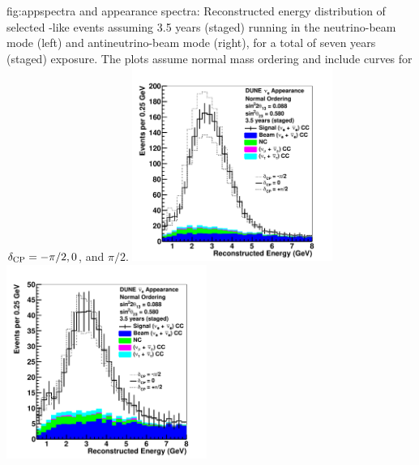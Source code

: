 \begin{dunefigure}{fig:appspectra}
{\nue and \anue appearance spectra: Reconstructed energy distribution of selected \nue {}-like events assuming 3.5 years (staged) running in the neutrino-beam mode (left) and antineutrino-beam mode (right), for a total of seven years (staged) exposure.  The plots assume normal mass ordering and include curves for $\delta_{\rm CP} = -\pi/2, 0$, and $\pi/2$.}
 \includegraphics[width=0.49\textwidth]{graphics/spec_app_nu_varydcp.pdf}
 \includegraphics[width=0.49\textwidth]{graphics/spec_app_anu_varydcp.pdf}
\end{dunefigure}



